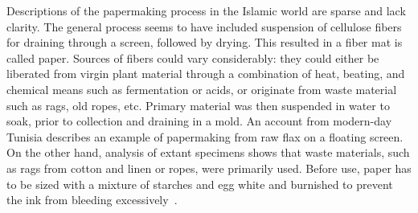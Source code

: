 Descriptions of the papermaking process in the Islamic world are sparse and
lack clarity. The general process seems to have included suspension of
cellulose fibers for draining through a screen, followed by drying. This
resulted in a fiber mat is called paper. Sources of fibers could vary
considerably: they could either be liberated from virgin plant material through
a combination of heat, beating, and chemical means such as fermentation or
acids, or originate from waste material such as rags, old ropes, etc. Primary
material was then suspended in water to soak, prior to collection and draining
in a mold. An account from modern-day Tunisia describes an example of
papermaking from raw flax on a floating screen. On the other hand, analysis of
extant specimens shows that waste materials, such as rags from cotton and linen
or ropes, were primarily used. Before use, paper has to be sized with a mixture
of starches and egg white and burnished to prevent the ink from bleeding
excessively~\cite[pg. 44-45]{bloompaper}.

